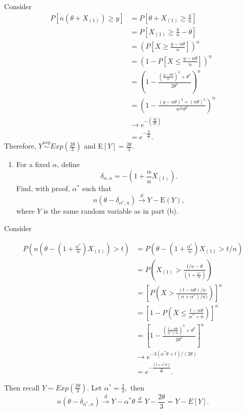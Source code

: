 \documentclass[12pt,]{article}
\providecommand{\tightlist}{%
  \setlength{\itemsep}{0pt}\setlength{\parskip}{0pt}}
\begin{document}
Consider \begin{align*}
P[n(\theta+X_{(1)})\ge y] & = P\left[\theta+X_{(1)}\ge \frac{y}{n}\right]\\
& = P\left[X_{(1)}\ge \frac{y}{n}-\theta\right]\\
& = \left(P\left[X \ge \frac{y-n\theta}{n}\right]\right)^n\\
& = \left(1 - P\left[X \le \frac{y-n\theta}{n}\right]\right)^n\\
& = \left(1 - \frac{\left(\frac{y-n\theta}{n}\right)^3+\theta^3}{2\theta^2}\right)^n\\
& = \left(1 - \frac{\left(y-n\theta\right)^3+(n\theta)^3}{n^32\theta^2}\right)^n\\
& \rightarrow e^{-\left(\frac{3y}{2\theta}\right)}\\
& = e^{-\frac{y}{\frac{2\theta}{3}}}.
\end{align*} Therefore,
\(Y\overset{asy}\sim Exp\left(\frac{2\theta}{3}\right)\) and
E\([Y]=\frac{2\theta}{3}.\)

\begin{enumerate}
\def\labelenumi{(\alph{enumi})}
\setcounter{enumi}{2}
\tightlist
\item
  For a fixed \(\alpha\), define
  \[\delta_{\alpha,n}=-\left(1+\frac{\alpha}{n}X_{(1)}\right).\] Find,
  with proof, \(\alpha^*\) such that
  \[n(\theta-\delta_{\alpha^*,n})\overset{d}\rightarrow Y - \text{E}(Y),\]
  where \(Y\) is the same random variable as in part (b).
\end{enumerate}

Consider

\begin{align*}
P\left(n(\theta - (1+\frac{\alpha^* }{n})X_{(1)}) > t \right) &= P\left(\theta - (1+\frac{\alpha^*}{n})X_{(1)} > t/n \right) \\
& = P\left(X_{(1)} > \frac{t/n-\theta}{(1+\frac{\alpha^*}{n})} \right)\\
& = \left[P\left(X > \frac{(t-n\theta)/n}{(n+\alpha^*)/n)} \right)\right]^n\\
& = \left[1 - P\left(X \le \frac{t-n\theta}{\alpha^*+n} \right)\right]^n\\
& = \left[1 - \frac{\left(\frac{t-n\theta}{\alpha^*+n}\right)^3+\theta^3}{2\theta^3}\right]^n\\
&\rightarrow e^{-3(\alpha^* \theta+t)/(2\theta)} \\
& = e^{-\frac{(t+\alpha^* \theta)}{\frac{2\theta}{3}}}.
\end{align*}

Then recall \(Y\sim Exp(\frac{2\theta}{3}).\) Let
\(\alpha^* = \frac{2}{3},\) then
\[n(\theta-\delta_{\alpha^*,n})\overset{d}\rightarrow Y - \alpha^* \theta \overset{d}= Y - \frac{2\theta}{3}=Y-E[Y].\]
\end{document}
